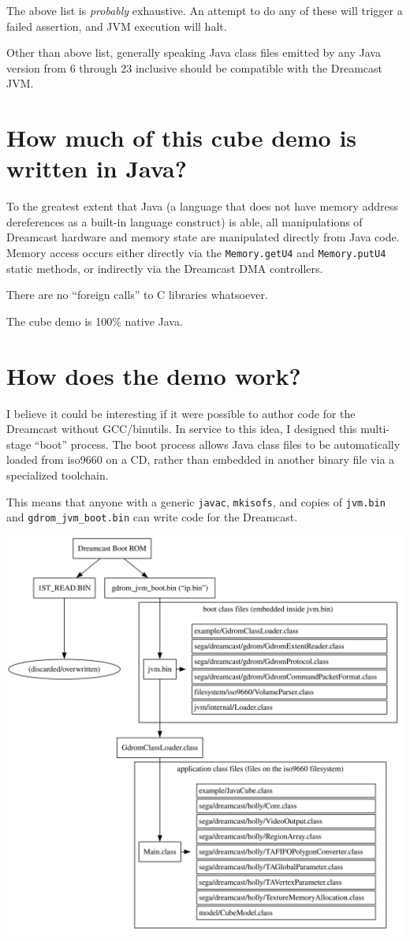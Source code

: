 \documentclass[20pt]{article}
\begin{document}
The above list is \textit{probably} exhaustive. An attempt to do any of these
will trigger a failed assertion, and JVM execution will halt.

Other than above list, generally speaking Java class files emitted by any Java
version from 6 through 23 inclusive should be compatible with the Dreamcast JVM.

\section{How much of this cube demo is written in Java?}

To the greatest extent that Java (a language that does not have memory address
dereferences as a built-in language construct) is able, all manipulations of
Dreamcast hardware and memory state are manipulated directly from Java
code. Memory access occurs either directly via the \texttt{Memory.getU4} and
\texttt{Memory.putU4} static methods, or indirectly via the Dreamcast DMA
controllers.

There are no “foreign calls” to C libraries whatsoever.

The cube demo is 100\% native Java.

\section{How does the demo work?}

I believe it could be interesting if it were possible to author code for the
Dreamcast without GCC/binutils. In service to this idea, I designed this
multi-stage “boot” process. The boot process allows Java class files to be
automatically loaded from iso9660 on a CD, rather than embedded in another
binary file via a specialized toolchain.

This means that anyone with a generic \texttt{javac}, \texttt{mkisofs}, and
copies of \texttt{jvm.bin} and \texttt{gdrom\_jvm\_boot.bin} can write code for
the Dreamcast.

\href{boot.svg}{\includegraphics{boot.svg}}
\end{document}
